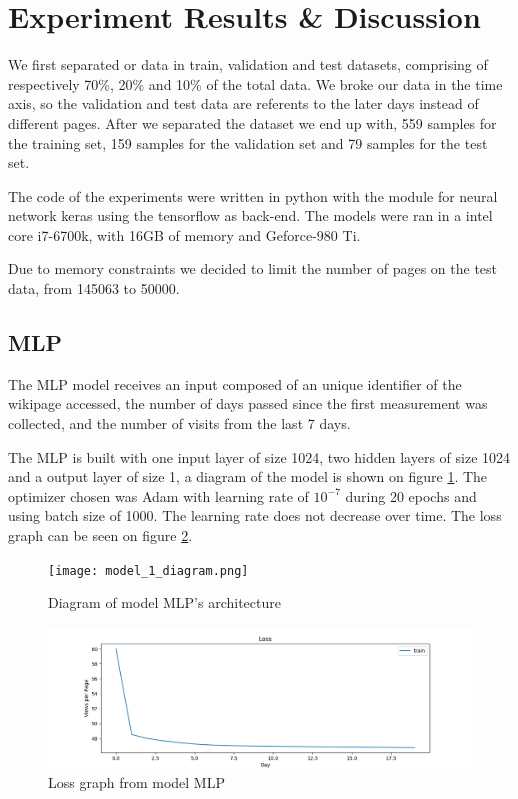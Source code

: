 \section{Experiment Results \& Discussion}
\label{sec:experiments}

We first separated or data in train, validation and test datasets,
comprising of respectively 70\%, 20\% and 10\% of the total data.
We broke our data in the time axis, so the validation and test data are referents to the later days instead of different pages.
After we separated the dataset we end up with, 559 samples for the training set, 159 samples for the validation set and 79 samples for the test set.

The code of the experiments were written in python with the module for neural network keras using the tensorflow as back-end.
The models were ran in a intel core i7-6700k, with 16GB of memory and Geforce-980 Ti.

Due to memory constraints we decided to limit the number of pages on the test data, from 145063 to 50000.

\subsection{MLP}

The MLP model receives an input composed of an unique identifier of the wikipage accessed,
the number of days passed since the first measurement was collected,
and the number of visits from the last 7 days.

The MLP is built with one input layer of size 1024, two hidden layers of size 1024 and a output layer of size 1,
a diagram of the model is shown on figure \ref{fig:model_1_diagram}.
The optimizer chosen was Adam with learning rate of $10^{-7}$ during 20 epochs and using batch size of 1000.
The learning rate does not decrease over time. The loss graph can be seen on figure \ref{fig:model_1_loss}.

\begin{figure}
	\centering
	\texttt{[image: model\_1\_diagram.png]}
	\caption{Diagram of model MLP's architecture\label{fig:model_1_diagram}}
\end{figure}

\begin{figure}
	\centering
	\includegraphics[width=\linewidth]{model_1_loss.png}
	\caption{Loss graph from model MLP\label{fig:model_1_loss}}
\end{figure}

